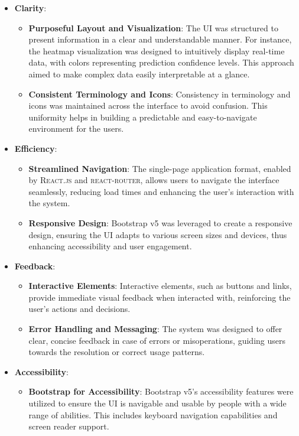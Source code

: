 \begin{itemize}
  \item \textbf{Clarity}: \begin{itemize}
          \item \textbf{Purposeful Layout and Visualization}: The UI was structured to present information in a clear and understandable manner. For instance, the heatmap visualization was designed to intuitively display real-time data, with colors representing prediction confidence levels. This approach aimed to make complex data easily interpretable at a glance.
          \item \textbf{Consistent Terminology and Icons}: Consistency in terminology and icons was maintained across the interface to avoid confusion. This uniformity helps in building a predictable and easy-to-navigate environment for the users.
        \end{itemize}
  \item \textbf{Efficiency}: \begin{itemize}
          \item \textbf{Streamlined Navigation}: The single-page application format, enabled by \textsc{React.js} and \textsc{react-router}, allows users to navigate the interface seamlessly, reducing load times and enhancing the user's interaction with the system.
          \item \textbf{Responsive Design}: Bootstrap v5 was leveraged to create a responsive design, ensuring the UI adapts to various screen sizes and devices, thus enhancing accessibility and user engagement.
        \end{itemize}
  \item \textbf{Feedback}: \begin{itemize}
          \item \textbf{Interactive Elements}: Interactive elements, such as buttons and links, provide immediate visual feedback when interacted with, reinforcing the user’s actions and decisions.
          \item \textbf{Error Handling and Messaging}: The system was designed to offer clear, concise feedback in case of errors or misoperations, guiding users towards the resolution or correct usage patterns.
        \end{itemize}
  \item \textbf{Accessibility}: \begin{itemize}
          \item \textbf{Bootstrap for Accessibility}: Bootstrap v5’s accessibility features were utilized to ensure the UI is navigable and usable by people with a wide range of abilities. This includes keyboard navigation capabilities and screen reader support.

\end{itemize}
\end{itemize}
